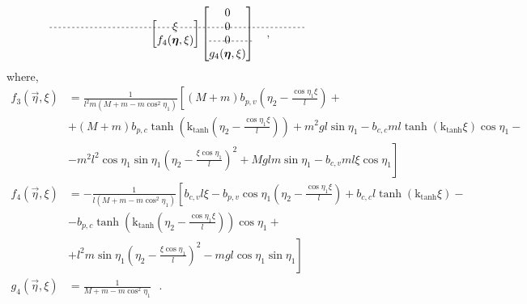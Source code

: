 \begin{align}
\begin{bmatrix}
    \xi    \\ %
    \begin{picture} (0,0)(0,0) \multiput(-95,14)(4,0){57}{\line(2,0){2}} \end{picture}
    f_4(\vec{\eta},\xi) 
  \end{bmatrix}
  \begin{bmatrix}
    0    \\
    0    \\
    0    \\  %
    \begin{picture} (0,0)(0,0) \multiput(0,14)(4,0){10}{\line(2,0){2}} \end{picture}
    g_4(\vec{\eta},\xi)
  \end{bmatrix}
  \ \ \ ,
  \label{eq:regularFormMatrix}
\end{align}
where,
\begingroup\makeatletter\def\f@size{10}\check@mathfonts
\def\maketag@@@#1{\hbox{\m@th\normalsize\normalfont#1}}%
\begin{align}
f_3(\vec{\eta},\xi) &= \frac{1}{ l^2 m (M + m - m \cos^2 \eta_1) }
\left[
(M + m) b_{p,v} \left(\eta_2 - \frac{\cos \eta_1 \xi}{l}\right) + \right. \nonumber \\
&+ (M + m) b_{p,c} \tanh\left(\mathrm{k}_{\mathrm{tanh}} \left(\eta_2 - \frac{ \cos \eta_1 \xi}{l}\right)\right) + m^2 g l \sin \eta_1 - b_{c,c} m l \tanh\left(\mathrm{k}_{\mathrm{tanh}} \xi\right) \cos \eta_1 - \nonumber \\
&- \left. m^2 l^2 \cos \eta_1 \sin \eta_1 \left(\eta_2 - \frac{\xi \cos \eta_1}{l}\right)^2 + M g l m \sin \eta_1 - b_{c,v} m l \xi \cos \eta_1
\right] \\
%
%
f_4(\vec{\eta},\xi) &= -\frac{1}{ l (M + m - m \cos^2 \eta_1) } \left[   b_{c,v} l \xi - b_{p,v} \cos \eta_1 \left(\eta_2 - \frac{\cos \eta_1 \xi}{l}\right) + b_{c,c} l \tanh\left(\mathrm{k}_{\mathrm{tanh}} \xi\right) - \right. \nonumber \\
&- b_{p,c} \tanh\left(\mathrm{k}_{\mathrm{tanh}} \left(\eta_2 - \frac{ \cos \eta_1 \xi}{l}\right)\right) \cos \eta_1 + \nonumber \\
&+ \left. l^2 m \sin \eta_1 \left(\eta_2 - \frac{\xi \cos \eta_1}{l}\right)^2 - m g l \cos \eta_1 \sin \eta_1  \right] \\
%
%
g_4(\vec{\eta},\xi) &= \frac{1}{M + m - m \cos^2 \eta_1 }
\ \ \ .
\label{eq:f3f4g4} \\ \nonumber
\end{align}
\endgroup \vspace{-44pt}

